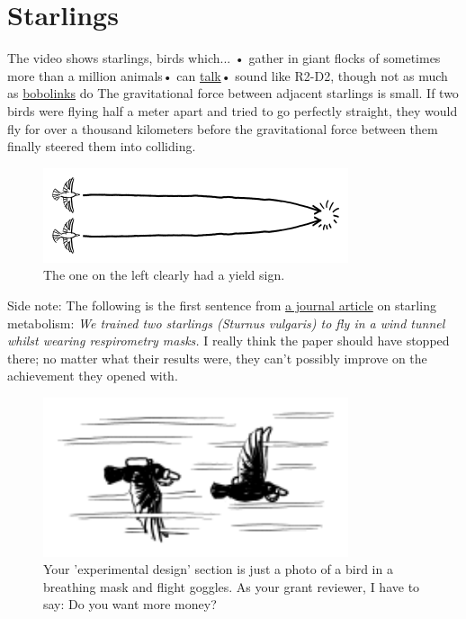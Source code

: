 {{
\chapter{Starlings}
}

\hfill{}

{The video shows starlings, birds which...}
• gather in giant flocks of sometimes more than a million animals• can \href{https://www.youtube.com/watch?v=1VZYG00\_qvE}{talk}• sound like R2-D2, though not as much as \href{https://www.youtube.com/watch?v=9ABjBldAtPQ\#t=9}{bobolinks} do
{The gravitational force between adjacent starlings is small. If two birds were flying half a meter apart and tried to go perfectly straight, they would fly for over a thousand kilometers before the gravitational force between them finally steered them into colliding.}

\begin{figure}[!htbp]
\centering
\includegraphics[scale=0.5, max width=0.8\textwidth]{imgs/a/99/collide.png}
\caption{The one on the left clearly had a yield sign.}
\end{figure}

{Side note: The following is the first sentence from \href{http://jeb.biologists.org/content/204/19/3311}{a journal article} on starling metabolism:}
\emph{We trained two starlings (Sturnus vulgaris) to fly in a wind tunnel whilst wearing respirometry masks.} 
{I really think the paper should have stopped there; no matter what their results were, they can't possibly improve on the achievement they opened with.}

\begin{figure}[!htbp]
\centering
\includegraphics[scale=0.5, max width=0.8\textwidth]{imgs/a/99/masks.png}
\caption{Your 'experimental design' section is just a photo of a bird in a breathing mask and flight goggles. As your grant reviewer, I have to say: Do you want more money?}
\end{figure}

}
